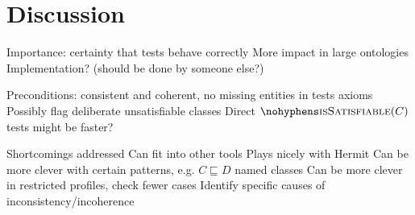 \documentclass[paper.tex]{subfiles}
\begin{document}
\section{Discussion}
\label{sec:discussion}

\begin{todos}
  \todo Importance: certainty that tests behave correctly
  \todo More impact in large ontologies
  \todo Implementation? (should be done by someone else?)
  \begin{todos}
    \todo Preconditions: consistent and coherent, no missing entities in tests axioms
    \todo Possibly flag deliberate unsatisfiable classes
    \todo Direct $\textproc{isSatisfiable}(C)$ tests
    \todo {} might be faster?
  \end{todos}
  \todo Shortcomings addressed
  \todo Can fit into other tools
  \todo Plays nicely with Hermit
  \todo Can be more clever with certain patterns, e.g. $C \sqsubseteq D$ named classes
  \todo Can be more clever in restricted profiles, check fewer cases
  \todo Identify specific causes of inconsistency/incoherence
\end{todos}
\end{document}
